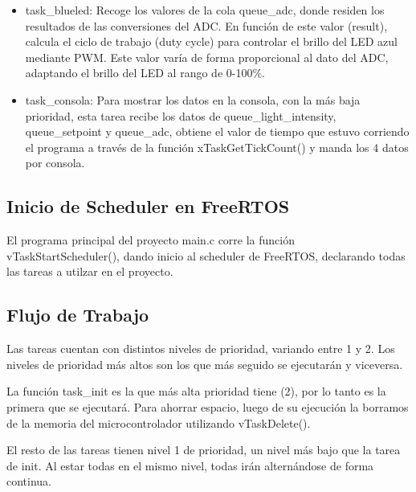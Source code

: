 \documentclass[conference]{IEEEtran}
\begin{document}
\begin{itemize}
            \item task\_blueled: Recoge los valores de la cola queue\_adc, donde residen los resultados de las conversiones del ADC. En función de este valor (result), calcula el ciclo de trabajo (duty cycle) para controlar el brillo del LED azul mediante PWM. Este valor varía de forma proporcional al dato del ADC, adaptando el brillo del LED al rango de 0-100\%.\par
            
            
            \item task\_consola: Para mostrar los datos en la consola, con la más baja prioridad, esta tarea recibe los datos de queue\_light\_intensity, queue\_setpoint y queue\_adc, obtiene el valor de tiempo que estuvo corriendo el programa a través de la función xTaskGetTickCount() y manda los 4 datos por consola.\par
        \end{itemize}

        \subsection{Inicio de Scheduler en FreeRTOS}
            El programa principal del proyecto main.c corre la función vTaskStartScheduler(), dando inicio al scheduler de FreeRTOS, declarando todas las tareas a utilzar en el proyecto.\par

        \subsection{Flujo de Trabajo}
            \begin{itemize}
                Las tareas cuentan con distintos niveles de prioridad, variando entre 1 y 2. Los niveles de prioridad más altos son los que más seguido se ejecutarán y viceversa.\par
                La función task\_init es la que más alta prioridad tiene (2), por lo tanto es la primera que se ejecutará. Para ahorrar espacio, luego de su ejecución la borramos de la memoria del microcontrolador utilizando vTaskDelete().\par
                El resto de las tareas tienen nivel 1 de prioridad, un nivel más bajo que la tarea de init. Al estar todas en el mismo nivel, todas irán alternándose de forma continua.\par
            \end{itemize}
\end{document}
